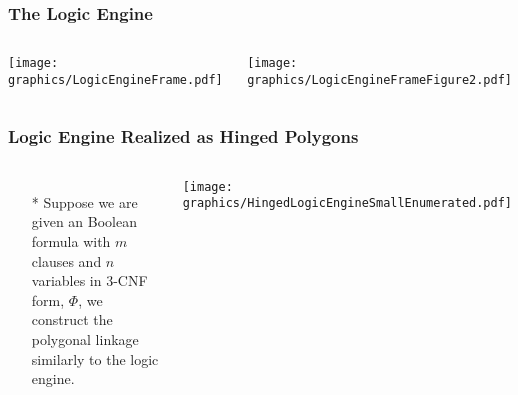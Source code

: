 \documentclass{beamer}
\begin{document}
\begin{frame} \frametitle{The Logic Engine}
    \begin{columns}[c]
        \begin{minipage}{\linewidth}
            \begin{center}
            \texttt{[image: graphics/LogicEngineFrame.pdf]}
            \end{center}
        \end{minipage}
        \begin{minipage}{\linewidth}
            \begin{center}
            \texttt{[image: graphics/LogicEngineFrameFigure2.pdf]}
            \end{center}
        \end{minipage}
    \end{columns}
\end{frame}

\begin{frame} \frametitle{Logic Engine Realized as Hinged Polygons}
    \begin{columns}[c]
        \begin{itemize}
            \item[*] Suppose we are given an Boolean formula with $m$ clauses and $n$ variables in 3-CNF form, $\Phi$, we construct the polygonal linkage similarly to the logic engine.
        \end{itemize}
        \begin{minipage}{\linewidth}
            \begin{center}
            \texttt{[image: graphics/HingedLogicEngineSmallEnumerated.pdf]}
            \end{center}
        \end{minipage}
    \end{columns}
\end{frame}
\end{document}
